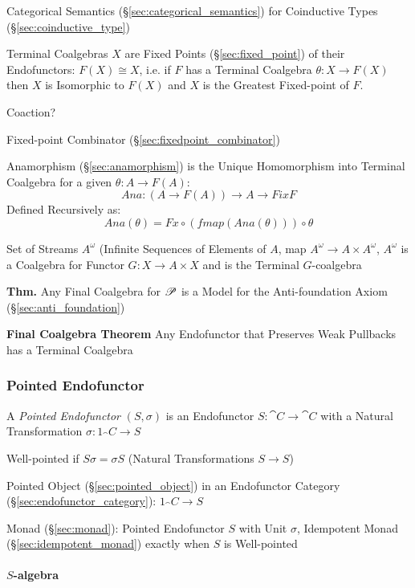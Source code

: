 Categorical Semantics (\S\ref{sec:categorical_semantics}) for
Coinductive Types (\S\ref{sec:coinductive_type})

Terminal Coalgebras $X$ are Fixed Points (\S\ref{sec:fixed_point}) of
their Endofunctors: $F(X) \cong X$, i.e. if $F$ has a Terminal
Coalgebra $\theta : X \rightarrow F(X)$ then $X$ is Isomorphic to
$F(X)$ and $X$ is the Greatest Fixed-point of $F$.

Coaction?

Fixed-point Combinator (\S\ref{sec:fixedpoint_combinator})

Anamorphism (\S\ref{sec:anamorphism}) is the Unique Homomorphism into
Terminal Coalgebra for a given $\theta : A \rightarrow F(A)$:
\[
  Ana : (A \rightarrow F (A)) \rightarrow A \rightarrow Fix F
\]
Defined Recursively as:
\[
  Ana (\theta) = Fx \circ (fmap (Ana (\theta))) \circ \theta
\]

Set of Streams $A^\omega$ (Infinite Sequences of Elements of $A$, map
$A^\omega \rightarrow A \times A^\omega$, $A^\omega$ is a Coalgebra
for Functor $G : X \rightarrow A \times X$ and is the Terminal
$G$-coalgebra

\textbf{Thm.} Any Final Coalgebra for $\mathscr{P}$ is a Model for the
Anti-foundation Axiom (\S\ref{sec:anti_foundation}) \cite{aczel88}

\textbf{Final Coalgebra Theorem} Any Endofunctor that Preserves Weak
Pullbacks has a Terminal Coalgebra \cite{aczel88}



\subsubsection{Pointed Endofunctor}\label{sec:pointed_endofunctor}

A \emph{Pointed Endofunctor} $(S,\sigma)$ is an Endofunctor $S :
\cat{C} \rightarrow \cat{C}$ with a Natural Transformation $\sigma :
1_\cat{C} \rightarrow S$

Well-pointed if $S \sigma = \sigma S$ (Natural Transformations $S
\rightarrow S$)

Pointed Object (\S\ref{sec:pointed_object}) in an Endofunctor Category
(\S\ref{sec:endofunctor_category}): $1_\cat{C} \rightarrow S$

Monad (\S\ref{sec:monad}): Pointed Endofunctor $S$ with Unit $\sigma$,
Idempotent Monad (\S\ref{sec:idempotent_monad}) exactly when $S$ is
Well-pointed



\paragraph{$S$-algebra}\label{sec:s_algebra}\hfill

